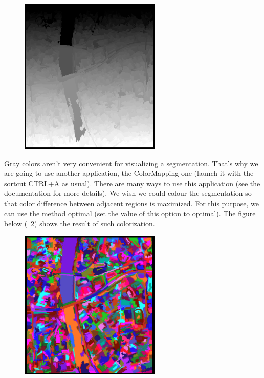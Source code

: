\begin{figure}[!h] 
  \center
  \includegraphics[width=0.6\textwidth]{../Art/MonteverdiImages/seg2.png}
  \label{fig:seg2}
\end{figure}

Gray colors aren't very convenient for visualizing a segmentation. That's why we are going to use another application, the ColorMapping one (launch it with the sortcut CTRL+A as usual).
There are many ways to use this application (see the documentation for more details). We wish we could colour the segmentation so that color difference between adjacent regions is maximized.
For this purpose, we can use the method optimal (set the value of this option to optimal). The figure below (~\ref{fig:seg3}) shows the result of such colorization.

\begin{figure}[!h] 
  \center
  \includegraphics[width=0.6\textwidth]{../Art/MonteverdiImages/seg3.png}
  \label{fig:seg3}
\end{figure}

